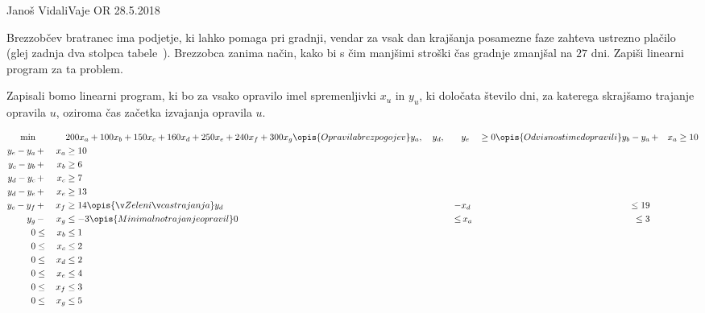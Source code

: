 \begin{naloga}{Janoš Vidali}{Vaje OR 28.5.2018}
\begin{vprasanje}
Brezzobčev bratranec ima podjetje, ki lahko pomaga pri gradnji,
vendar za vsak dan krajšanja posamezne faze zahteva ustrezno plačilo
(glej zadnja dva stolpca tabele~\tab[brezzobec]).
Brezzobca zanima način,
kako bi s čim manjšimi stroški čas gradnje zmanjšal na $27$ dni.
Zapiši linearni program za ta problem.
\end{vprasanje}

\begin{odgovor}
Zapisali bomo linearni program,
ki bo za vsako opravilo imel spremenljivki $x_u$ in $y_u$,
ki določata število dni, za katerega skrajšamo trajanje opravila $u$,
oziroma čas začetka izvajanja opravila $u$.

\needspace{\baselineskip}
\begin{alignat*}{2}
\min &&&{} 200 x_a + 100 x_b + 150 x_c + 160 x_d + 250 x_e + 240 x_f + 300 x_g
\opis{Opravila brez pogojev}
y_a, \quad y_d, &&{} y_e &\ge 0
\opis{Odvisnosti med opravili}
y_b - y_a &\,+& x_a &\ge 10 \\
y_e - y_a &\,+& x_a &\ge 10 \\
y_c - y_b &\,+& x_b &\ge 6 \\
y_d - y_c &\,+& x_c &\ge 7 \\
y_d - y_e &\,+& x_e &\ge 13 \\
y_c - y_f &\,+& x_f &\ge 14
\opis{Želeni čas trajanja}
y_d &\,-& x_d &\le 19 \\
y_g &\,-& x_g &\le -3
\opis{Minimalno trajanje opravil}
0 &\le&\, x_a &\le 3 \\
0 &\le&\, x_b &\le 1 \\
0 &\le&\, x_c &\le 2 \\
0 &\le&\, x_d &\le 2 \\
0 &\le&\, x_e &\le 4 \\
0 &\le&\, x_f &\le 3 \\
0 &\le&\, x_g &\le 5
\end{alignat*}
\end{odgovor}
\end{naloga}
